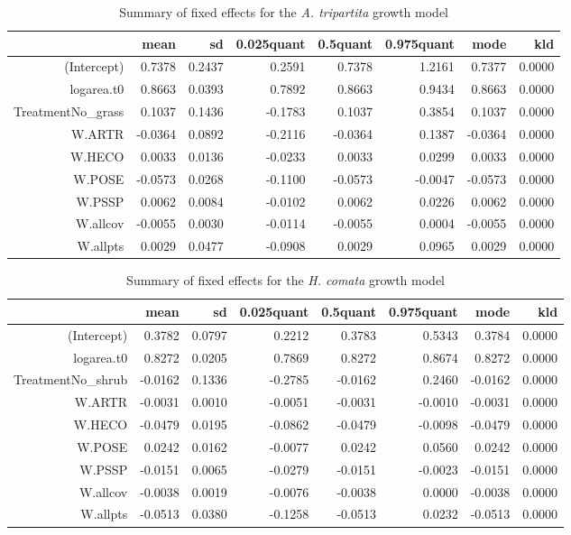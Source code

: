 \documentclass[11pt]{article}
\begin{document}
\begin{table}[ht]
\centering
\caption{Summary of fixed effects for the \textit{A. tripartita} growth model} 
\label{ARTRgrowth}
\begin{tabular}{rrrrrrrr}
  \hline
 & mean & sd & 0.025quant & 0.5quant & 0.975quant & mode & kld \\ 
  \hline
(Intercept) & 0.7378 & 0.2437 & 0.2591 & 0.7378 & 1.2161 & 0.7377 & 0.0000 \\ 
  logarea.t0 & 0.8663 & 0.0393 & 0.7892 & 0.8663 & 0.9434 & 0.8663 & 0.0000 \\ 
  TreatmentNo\_grass & 0.1037 & 0.1436 & -0.1783 & 0.1037 & 0.3854 & 0.1037 & 0.0000 \\ 
  W.ARTR & -0.0364 & 0.0892 & -0.2116 & -0.0364 & 0.1387 & -0.0364 & 0.0000 \\ 
  W.HECO & 0.0033 & 0.0136 & -0.0233 & 0.0033 & 0.0299 & 0.0033 & 0.0000 \\ 
  W.POSE & -0.0573 & 0.0268 & -0.1100 & -0.0573 & -0.0047 & -0.0573 & 0.0000 \\ 
  W.PSSP & 0.0062 & 0.0084 & -0.0102 & 0.0062 & 0.0226 & 0.0062 & 0.0000 \\ 
  W.allcov & -0.0055 & 0.0030 & -0.0114 & -0.0055 & 0.0004 & -0.0055 & 0.0000 \\ 
  W.allpts & 0.0029 & 0.0477 & -0.0908 & 0.0029 & 0.0965 & 0.0029 & 0.0000 \\ 
   \hline
\end{tabular}
\end{table}

\begin{table}[ht]
\centering
\caption{Summary of fixed effects for the \textit{H. comata} growth model} 
\label{HECOgrowth}
\begin{tabular}{rrrrrrrr}
  \hline
 & mean & sd & 0.025quant & 0.5quant & 0.975quant & mode & kld \\ 
  \hline
(Intercept) & 0.3782 & 0.0797 & 0.2212 & 0.3783 & 0.5343 & 0.3784 & 0.0000 \\ 
  logarea.t0 & 0.8272 & 0.0205 & 0.7869 & 0.8272 & 0.8674 & 0.8272 & 0.0000 \\ 
  TreatmentNo\_shrub & -0.0162 & 0.1336 & -0.2785 & -0.0162 & 0.2460 & -0.0162 & 0.0000 \\ 
  W.ARTR & -0.0031 & 0.0010 & -0.0051 & -0.0031 & -0.0010 & -0.0031 & 0.0000 \\ 
  W.HECO & -0.0479 & 0.0195 & -0.0862 & -0.0479 & -0.0098 & -0.0479 & 0.0000 \\ 
  W.POSE & 0.0242 & 0.0162 & -0.0077 & 0.0242 & 0.0560 & 0.0242 & 0.0000 \\ 
  W.PSSP & -0.0151 & 0.0065 & -0.0279 & -0.0151 & -0.0023 & -0.0151 & 0.0000 \\ 
  W.allcov & -0.0038 & 0.0019 & -0.0076 & -0.0038 & 0.0000 & -0.0038 & 0.0000 \\ 
  W.allpts & -0.0513 & 0.0380 & -0.1258 & -0.0513 & 0.0232 & -0.0513 & 0.0000 \\ 
   \hline
\end{tabular}
\end{table}
\end{document}
